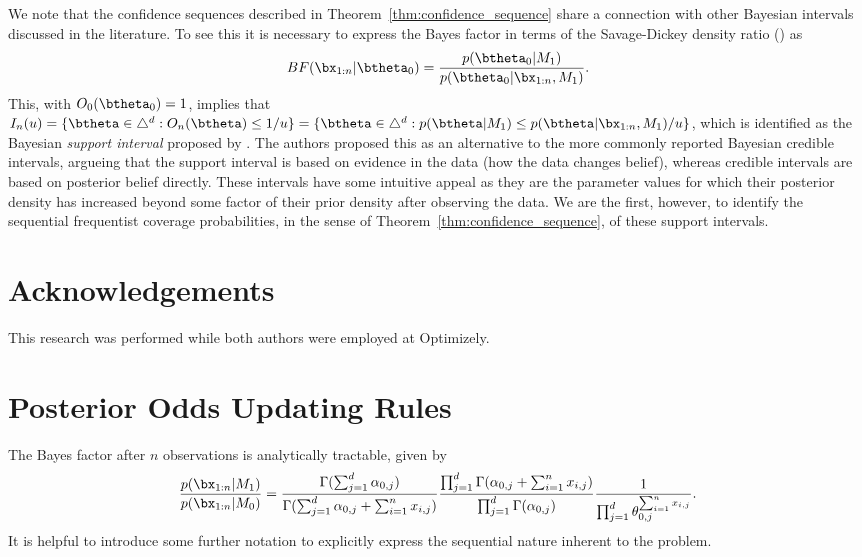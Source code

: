 \documentclass[11pt]{article}
\begin{document}
We note that the confidence sequences described in Theorem~\ref{thm:confidence_sequence} share a connection with other Bayesian intervals discussed in the literature.
To see this it is necessary to express the Bayes factor in terms of the Savage-Dickey density ratio (\cite{dickey}) as
\begin{equation}
    BF(\bx_{1:n}|\btheta_0) = \frac{p(\btheta_0| M_1)}{p(\btheta_0|\bx_{1:n},M_1)}.
\end{equation}
This, with $O_0(\btheta_0)=1$, implies that $I_n(u) = \lbrace \btheta \in \triangle^d : O_n(\btheta) \leq 1/u \rbrace = \lbrace \btheta  \in \triangle^d : p(\btheta| M_1)\leq p(\btheta|\bx_{1:n}, M_1)/u \rbrace $, which is identified as the Bayesian \textit{support interval} proposed by \cite{support_interval}.
The authors proposed this as an alternative to the more commonly reported Bayesian credible intervals, argueing that the support interval is based on evidence in the data (how the data changes belief), whereas credible intervals are based on posterior belief directly.
These intervals have some intuitive appeal as they are the parameter values for which their posterior density has increased beyond some factor of their prior density after observing the data.
We are the first, however, to identify the sequential frequentist coverage probabilities, in the sense of Theorem~\ref{thm:confidence_sequence}, of these support intervals.

\section{Acknowledgements}
This research was performed while both authors were employed at Optimizely.





\appendix
\section{Posterior Odds Updating Rules}
\label{app:posterior_odds}
The Bayes factor after $n$ observations is analytically tractable, given by
\begin{equation}
  \label{eq:bayes_factor}
 \frac{p(\bx_{1:n}|M_1)}{p(\bx_{1:n}|M_0)} = \frac{\Gamma(\sum_{j=1}^{d} \alpha_{0,j})}{\Gamma(\sum_{j=1}^{d} \alpha_{0,j} + \sum_{i=1}^{n}x_{i,j})}\frac{\prod_{j=1}^{d}\Gamma(\alpha_{0,j} + \sum_{i=1}^{n}x_{i,j} )}{\prod_{j=1}^{d}\Gamma(\alpha_{0,j} )}\frac{1}{\prod_{j=1}^{d} \theta_{0,j}^{\sum_{i=1}^{n}x_{i,j}}}.
\end{equation}
It is helpful to introduce some further notation to explicitly express the sequential nature inherent to the problem.
\end{document}
